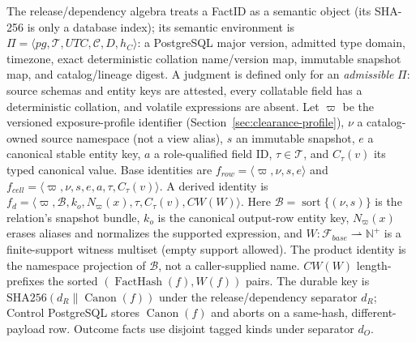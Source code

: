 \documentclass[10pt,journal,compsoc]{IEEEtran}
\newcommand{\facts}{\mathcal{F}}
\begin{document}
The release/dependency algebra treats a FactID as a semantic object (its
SHA-256 is only a database index); its semantic environment is
$\Pi=\langle pg,\mathcal T,UTC,\mathcal C,D,h_C\rangle$: a PostgreSQL major
version, admitted type domain, timezone, exact deterministic collation
name/version map, immutable snapshot map, and catalog/lineage digest.  A
judgment is defined only for an \emph{admissible} $\Pi$: source schemas and
entity keys are attested, every collatable field has a deterministic collation,
and volatile expressions are absent.  Let $\varpi$ be the versioned
exposure-profile identifier (Section~\ref{sec:clearance-profile}), $\nu$ a
catalog-owned source namespace (not a view alias), $s$ an immutable snapshot,
$e$ a canonical stable entity key, $a$ a role-qualified field ID, $\tau\in\mathcal T$, and
$C_\tau(v)$ its typed canonical value.  Base identities are
$f_{row}=\langle\varpi,\nu,s,e\rangle$ and
$f_{cell}=\langle\varpi,\nu,s,e,a,\tau,C_\tau(v)\rangle$. A derived identity is
$f_d=\langle\varpi,\mathcal B,k_o,N_\varpi(x),\tau,C_\tau(v),CW(W)\rangle$.
Here $\mathcal B=\operatorname{sort}\{(\nu,s)\}$ is the relation's snapshot
bundle, $k_o$ is the canonical output-row entity key, $N_\varpi(x)$ erases aliases
and normalizes the supported expression, and
$W:\facts_{base}\rightharpoonup\mathbb N^+$
is a finite-support witness multiset (empty support allowed). The
product identity is the namespace projection of $\mathcal B$, not a
caller-supplied name. $CW(W)$ length-prefixes the sorted
$(\operatorname{FactHash}(f),W(f))$ pairs. The durable key is
$\mathrm{SHA256}(d_R\|\operatorname{Canon}(f))$ under the release/dependency
separator $d_R$; Control PostgreSQL stores $\operatorname{Canon}(f)$
and aborts on a same-hash, different-payload row. Outcome facts use
disjoint tagged kinds under separator $d_O$.
\end{document}
